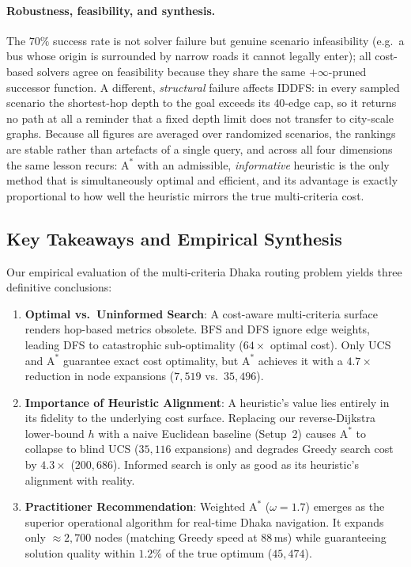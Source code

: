 \documentclass{ai-lab-report}
\begin{document}
\paragraph{Robustness, feasibility, and synthesis.}
The $70\%$ success rate is not solver failure but genuine scenario infeasibility (e.g.\ a bus whose origin is surrounded by narrow roads it cannot legally enter); all cost-based solvers agree on feasibility because they share the same $+\infty$-pruned successor function. A different, \emph{structural} failure affects IDDFS: in every sampled scenario the shortest-hop depth to the goal exceeds its $40$-edge cap, so it returns no path at all a reminder that a fixed depth limit does not transfer to city-scale graphs. Because all figures are averaged over randomized scenarios, the rankings are stable rather than artefacts of a single query, and across all four dimensions the same lesson recurs: $\text{A}^\ast$ with an admissible, \emph{informative} heuristic is the only method that is simultaneously optimal and efficient, and its advantage is exactly proportional to how well the heuristic mirrors the true multi-criteria cost.





\subsection{Key Takeaways and Empirical Synthesis}
\label{sec:a1takeaways}

Our empirical evaluation of the multi-criteria Dhaka routing problem yields three definitive conclusions:

\begin{enumerate}
  \item \textbf{Optimal vs.\ Uninformed Search}: A cost-aware multi-criteria surface renders hop-based metrics obsolete. BFS and DFS ignore edge weights, leading DFS to catastrophic sub-optimality ($64\times$ optimal cost). Only UCS and $\text{A}^\ast$ guarantee exact cost optimality, but $\text{A}^\ast$ achieves it with a $4.7\times$ reduction in node expansions ($7{,}519$ vs.\ $35{,}496$).
  \item \textbf{Importance of Heuristic Alignment}: A heuristic's value lies entirely in its fidelity to the underlying cost surface. Replacing our reverse-Dijkstra lower-bound $h$ with a naive Euclidean baseline (Setup~2) causes $\text{A}^\ast$ to collapse to blind UCS ($35{,}116$ expansions) and degrades Greedy search cost by $4.3\times$ ($200{,}686$). Informed search is only as good as its heuristic's alignment with reality.
  \item \textbf{Practitioner Recommendation}: Weighted $\text{A}^\ast$ ($\omega=1.7$) emerges as the superior operational algorithm for real-time Dhaka navigation. It expands only ${\approx}2{,}700$ nodes (matching Greedy speed at $88$\,ms) while guaranteeing solution quality within $1.2\%$ of the true optimum ($45{,}474$).
\end{enumerate}
\end{document}
